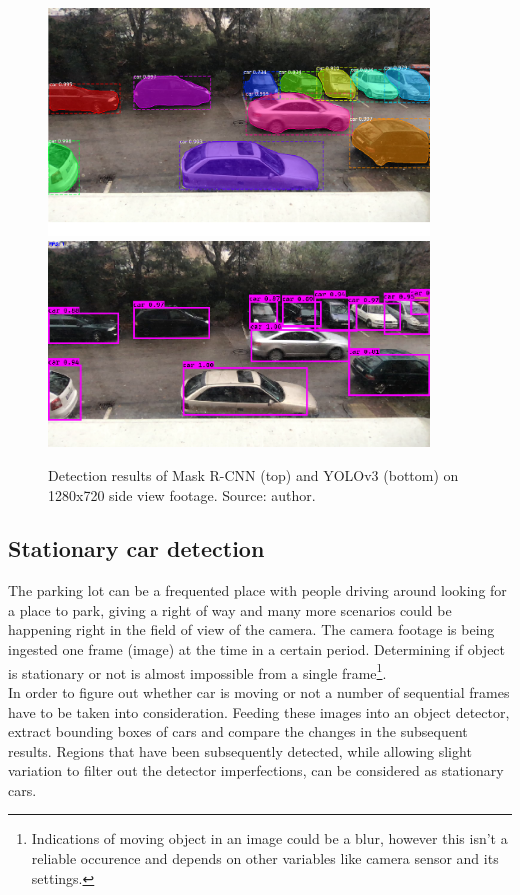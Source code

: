 \documentclass[thesis=M,english]{FITthesis}[2019/03/06]
\begin{document}
\begin{figure}[!htb]
	\centering
	\includegraphics[width=0.90\textwidth]{imgs/mask-np.png}
	\includegraphics[width=0.90\textwidth]{imgs/yolo-np.png}
	\caption{Detection results of Mask R-CNN (top) and YOLOv3 (bottom) on 1280x720 side view footage. Source: author.}
	\label{label:comparison_np}
\end{figure}


\subsection{Stationary car detection}
The parking lot can be a frequented place with people driving around looking for a place to park, giving a right of way and many more scenarios could be happening right in the field of view of the camera. The camera footage is being ingested one frame (image) at the time in a certain period. Determining if object is stationary or not is almost impossible from a single frame\footnote{Indications of moving object in an image could be a blur, however this isn't a reliable occurence and depends on other variables like camera sensor and its settings.}.\\

In order to figure out whether car is moving or not a number of sequential frames have to be taken into consideration. Feeding these images into an object detector, extract bounding boxes of cars and compare the changes in the subsequent results. Regions that have been subsequently detected, while allowing slight variation to filter out the detector imperfections, can be considered as stationary cars.
\end{document}
